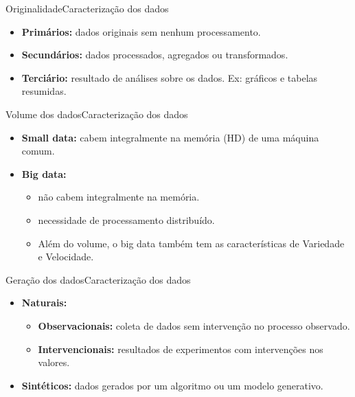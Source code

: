\documentclass[t]{beamer}
\begin{document}

\begin{ftst}{Originalidade}{Caracterização dos dados}
\vone
\begin{itemize}
    \item \textbf{Primários:} dados originais sem nenhum processamento.
    \vone
    \item \textbf{Secundários:} dados processados, agregados ou transformados.
    \vone
    \item \textbf{Terciário:} resultado de análises sobre os dados. Ex: gráficos e tabelas resumidas.
\end{itemize}
\end{ftst}


\begin{ftst}{Volume dos dados}{Caracterização dos dados}
\vone
\begin{itemize}
    \item \textbf{Small data:} cabem integralmente na memória (HD) de uma máquina comum.
    \vone
    \item \textbf{Big data:} 
    \begin{itemize}
        \item não cabem integralmente na memória. 
        \item necessidade de processamento distribuído.
        \item Além do volume, o big data também tem as características de Variedade e Velocidade.
    \end{itemize}

\end{itemize}
\end{ftst}


\begin{ftst}{Geração dos dados}{Caracterização dos dados}
\vone
\begin{itemize}
    \item \textbf{Naturais:} 
    \begin{itemize}
        \item \textbf{Observacionais:} coleta de dados sem intervenção no processo observado.
        \item \textbf{Intervencionais:} resultados de experimentos com intervenções nos valores.
    \end{itemize}
    \vone
    \item \textbf{Sintéticos:} dados gerados por um algoritmo ou um modelo generativo.

\end{itemize}
\end{ftst}
\end{document}
